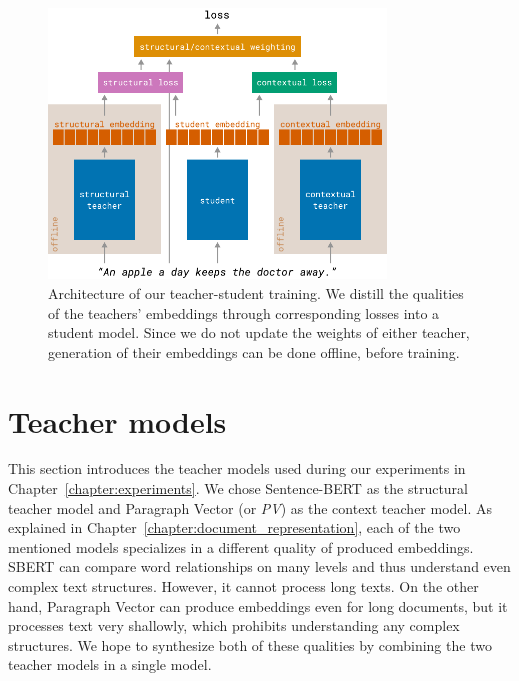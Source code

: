 \begin{figure}
  \centering
  \includegraphics[width=0.8\textwidth]{./img/training_architecture.pdf}

  \caption{Architecture of our teacher-student training. We distill the
  qualities of the teachers' embeddings through corresponding losses into a
  student model. Since we do not update the weights of either teacher,
  generation of their embeddings can be done offline, before training.}

  \label{fig:teacher_student_train_arch}

\end{figure}

\section{Teacher models}\label{section:teacher_models}

This section introduces the teacher models used during our experiments in
Chapter~\ref{chapter:experiments}. We chose Sentence-BERT
\citep{reimers2019sentence} as the structural teacher model and Paragraph
Vector \citep{le2014distributed} (or \emph{PV}) as the context teacher model.
As explained in Chapter~\ref{chapter:document_representation}, each of the two
mentioned models specializes in a different quality of produced embeddings.
SBERT can compare word relationships on many levels and thus understand even
complex text structures. However, it cannot process long texts. On the other
hand, Paragraph Vector can produce embeddings even for long documents, but it
processes text very shallowly, which prohibits understanding any complex
structures. We hope to synthesize both of these qualities by combining the two
teacher models in a single model.

